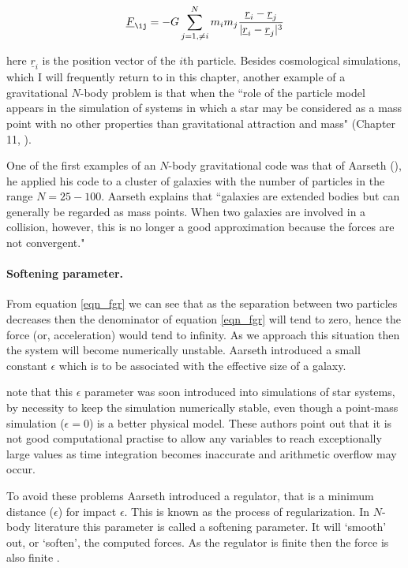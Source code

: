 \begin{equation}
\label{eqn_fgr}
\underline{F}_{\ij} = -G \sum_{j = 1,\ne i}^N m_i m_j \frac{\underline{r}_i -\underline{r}_j}{|\underline{r}_i - \underline{r}_j|^3}
\end{equation}

\noindent here $\underline{r}_i$ is the position vector of the $i$th particle. Besides cosmological simulations, which I will frequently return to in this chapter, another example of a gravitational $N$-body problem is that when the ``role of the particle model appears in the simulation of systems in which a star may be considered as a mass point with no other properties than gravitational attraction and mass" (Chapter 11, \citet{bib_he}).

One of the first examples of an $N$-body gravitational code was that of Aarseth (\citeyear{bib_aar2}), he applied his code to a cluster of galaxies with the number of particles in the range $N = 25 - 100$. Aarseth explains that ``galaxies are extended bodies but can generally be regarded as mass points. When two galaxies are involved in a collision, however, this is no longer a good approximation because the forces are not convergent."

\paragraph{Softening parameter.}
From equation \ref{eqn_fgr} we can see that as the separation between two particles decreases then the denominator of equation \ref{eqn_fgr} will tend to zero, hence the force (or, acceleration) would tend to infinity. As we approach this situation then the system will become numerically unstable. Aarseth introduced a small constant $\epsilon$ which is to be associated with the effective size of a galaxy.

\citet{bib_he} note that this $\epsilon$ parameter was soon introduced into simulations of star systems, by necessity to keep the simulation numerically stable, even though a point-mass simulation ($\epsilon = 0$) is a better physical model. These authors point out that it is not good computational practise to allow any variables to reach exceptionally large values as time integration becomes inaccurate and arithmetic overflow may occur.

To avoid these problems Aarseth introduced a regulator, that is a minimum distance ($\epsilon$) for impact $\epsilon$.
This is known as the process of regularization. In $N$-body literature this parameter is called a softening parameter. It will `smooth' out, or `soften', the computed forces. As the regulator is finite then the force is also finite \citep{bib_aar, bib_heg}.

